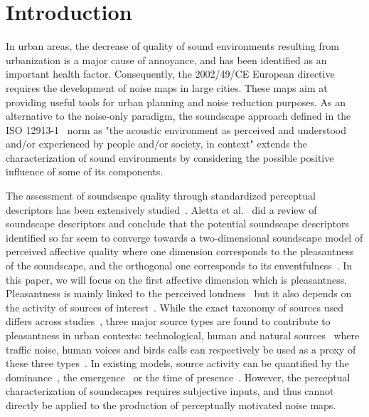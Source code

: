 \documentclass[twocolumn]{article}
\begin{document}
\section{Introduction}
\label{sec:intro}
In urban areas, the decrease of quality of sound environments resulting from urbanization is a major cause of annoyance, and has been identified as an important health factor. Consequently, the 2002/49/CE European directive~\cite{ec2002} requires the development of noise maps in large cities. These maps aim at providing useful tools for urban planning and noise reduction purposes. As an alternative to the noise-only paradigm, the soundscape approach defined in the ISO 12913-1~\cite{iso2014} norm as "the acoustic environment as perceived and understood and/or experienced by people and/or society, in context" extends the characterization of sound environments by considering the possible positive influence of some of its components.

The assessment of soundscape quality through standardized perceptual descriptors has been extensively studied~\cite{viollon2000, axelsson2010, cain2013, jeon2018, aletta2016}. Aletta et al.~\cite{aletta2016} did a review of soundscape descriptors and conclude that the potential soundscape descriptors identified so far seem to converge towards a two-dimensional soundscape model of perceived affective quality where one dimension corresponds to the pleasantness of the soundscape, and the orthogonal one corresponds to its enventfulness~\cite{axelsson2010, aumond2017, delaitre2014}. In this paper, we will focus on the first affective dimension which is pleasantness. Pleasantness is mainly linked to the perceived loudness~\cite{blauert1997, jekosch2004} but it also depends on the activity of sources of interest~\cite{nilsson2007, perez2012}. While the exact taxonomy of sources used differs across studies~\cite{guastavino2007, gygi2007, salamon2014, brown2011}, three major source types are found to contribute to pleasantness in urban contexts: technological, human and natural sources~\cite{nilsson2007, axelsson2010} where traffic noise, human voices and birds calls can respectively be used as a proxy of these three types~\cite{lavandier2006, ricciardi2014, aumond2017}. In existing models, source activity can be quantified by the dominance~\cite{hong2017}, the emergence~\cite{guastavino2006} or the time of presence~\cite{ricciardi2014}. However, the perceptual characterization of soundscapes requires subjective inputs, and thus cannot directly be applied to the production of perceptually motivated noise maps.
\end{document}
